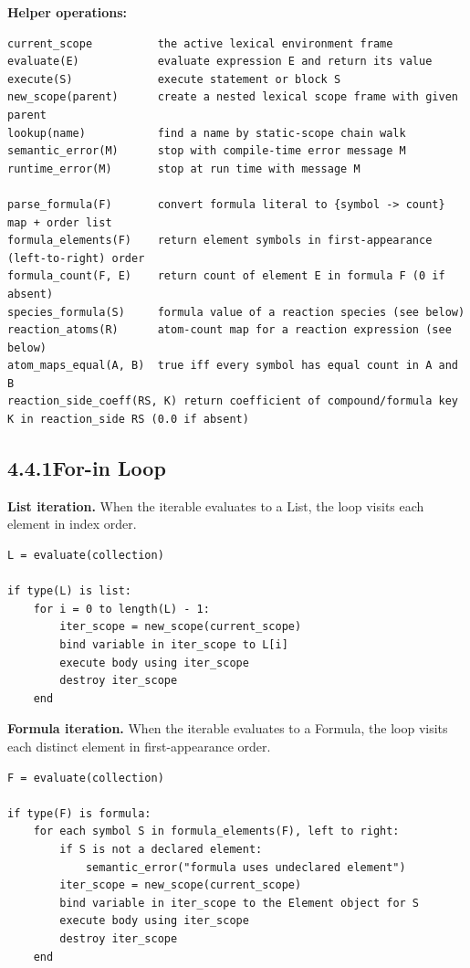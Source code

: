 \documentclass[11pt,a4paper]{article}
\begin{document}
\textbf{Helper operations:}
\begin{lstlisting}[style=sem]
current_scope          the active lexical environment frame
evaluate(E)            evaluate expression E and return its value
execute(S)             execute statement or block S
new_scope(parent)      create a nested lexical scope frame with given parent
lookup(name)           find a name by static-scope chain walk
semantic_error(M)      stop with compile-time error message M
runtime_error(M)       stop at run time with message M

parse_formula(F)       convert formula literal to {symbol -> count} map + order list
formula_elements(F)    return element symbols in first-appearance (left-to-right) order
formula_count(F, E)    return count of element E in formula F (0 if absent)
species_formula(S)     formula value of a reaction species (see below)
reaction_atoms(R)      atom-count map for a reaction expression (see below)
atom_maps_equal(A, B)  true iff every symbol has equal count in A and B
reaction_side_coeff(RS, K) return coefficient of compound/formula key K in reaction_side RS (0.0 if absent)
\end{lstlisting}

\subsection{4.4.1\quad For-in Loop}

\textbf{List iteration.}\; When the iterable evaluates to a List, the loop visits each element in index order.

\begin{lstlisting}[style=sem]
L = evaluate(collection)

if type(L) is list:
    for i = 0 to length(L) - 1:
        iter_scope = new_scope(current_scope)
        bind variable in iter_scope to L[i]
        execute body using iter_scope
        destroy iter_scope
    end
\end{lstlisting}

\textbf{Formula iteration.}\; When the iterable evaluates to a Formula, the loop visits each distinct element in first-appearance order.

\begin{lstlisting}[style=sem]
F = evaluate(collection)

if type(F) is formula:
    for each symbol S in formula_elements(F), left to right:
        if S is not a declared element:
            semantic_error("formula uses undeclared element")
        iter_scope = new_scope(current_scope)
        bind variable in iter_scope to the Element object for S
        execute body using iter_scope
        destroy iter_scope
    end
\end{lstlisting}
\end{document}
